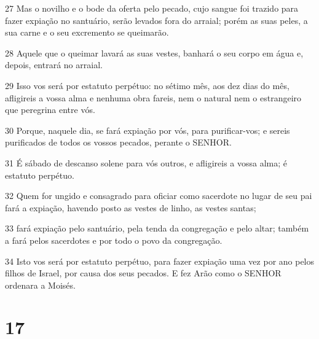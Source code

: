 \par 27 Mas o novilho e o bode da oferta pelo pecado, cujo sangue foi trazido para fazer expiação no santuário, serão levados fora do arraial; porém as suas peles, a sua carne e o seu excremento se queimarão.
\par 28 Aquele que o queimar lavará as suas vestes, banhará o seu corpo em água e, depois, entrará no arraial.
\par 29 Isso vos será por estatuto perpétuo: no sétimo mês, aos dez dias do mês, afligireis a vossa alma e nenhuma obra fareis, nem o natural nem o estrangeiro que peregrina entre vós.
\par 30 Porque, naquele dia, se fará expiação por vós, para purificar-vos; e sereis purificados de todos os vossos pecados, perante o SENHOR.
\par 31 É sábado de descanso solene para vós outros, e afligireis a vossa alma; é estatuto perpétuo.
\par 32 Quem for ungido e consagrado para oficiar como sacerdote no lugar de seu pai fará a expiação, havendo posto as vestes de linho, as vestes santas;
\par 33 fará expiação pelo santuário, pela tenda da congregação e pelo altar; também a fará pelos sacerdotes e por todo o povo da congregação.
\par 34 Isto vos será por estatuto perpétuo, para fazer expiação uma vez por ano pelos filhos de Israel, por causa dos seus pecados. E fez Arão como o SENHOR ordenara a Moisés.

\chapter{17}

